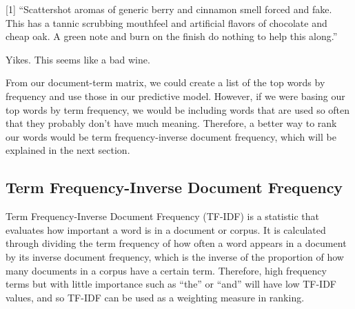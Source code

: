 \documentclass[12pt,twoside]{amherstthesis}
\begin{document}
{[}1{]} ``Scattershot aromas of generic berry and cinnamon smell forced
and fake. This has a tannic scrubbing mouthfeel and artificial flavors
of chocolate and cheap oak. A green note and burn on the finish do
nothing to help this along.''

Yikes. This seems like a bad wine.

From our document-term matrix, we could create a list of the top words
by frequency and use those in our predictive model. However, if we were
basing our top words by term frequency, we would be including words that
are used so often that they probably don't have much meaning. Therefore,
a better way to rank our words would be term frequency-inverse document
frequency, which will be explained in the next section.

\subsection{Term Frequency-Inverse Document
Frequency}\label{term-frequency-inverse-document-frequency}

Term Frequency-Inverse Document Frequency (TF-IDF) is a statistic that
evaluates how important a word is in a document or corpus. It is
calculated through dividing the term frequency of how often a word
appears in a document by its inverse document frequency, which is the
inverse of the proportion of how many documents in a corpus have a
certain term. Therefore, high frequency terms but with little importance
such as ``the'' or ``and'' will have low TF-IDF values, and so TF-IDF
can be used as a weighting measure in ranking.
\end{document}

